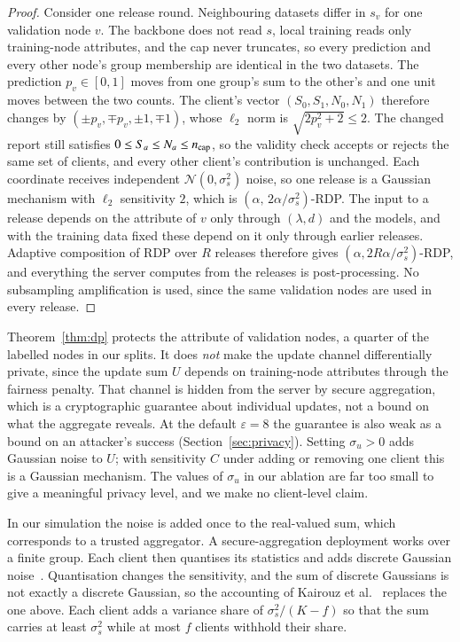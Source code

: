 \begin{proof}
Consider one release round. Neighbouring datasets differ in $s_v$ for one validation node $v$. The backbone does not read $s$, local training reads only training-node attributes, and the cap never truncates, so every prediction and every other node's group membership are identical in the two datasets. The prediction $p_v\in[0,1]$ moves from one group's sum to the other's and one unit moves between the two counts. The client's vector $(S_0,S_1,N_0,N_1)$ therefore changes by $(\pm p_v,\mp p_v,\pm1,\mp1)$, whose $\ell_2$ norm is $\sqrt{2p_v^2+2}\le2$. The changed report still satisfies $0\le S_a\le N_a\le n_{\mathrm{cap}}$, so the validity check accepts or rejects the same set of clients, and every other client's contribution is unchanged. Each coordinate receives independent $\mathcal{N}(0,\sigma_s^2)$ noise, so one release is a Gaussian mechanism with $\ell_2$ sensitivity $2$, which is $(\alpha,\,2\alpha/\sigma_s^2)$-RDP. The input to a release depends on the attribute of $v$ only through $(\lambda,d)$ and the models, and with the training data fixed these depend on it only through earlier releases. Adaptive composition of RDP over $R$ releases therefore gives $(\alpha,2R\alpha/\sigma_s^2)$-RDP, and everything the server computes from the releases is post-processing. No subsampling amplification is used, since the same validation nodes are used in every release.
\end{proof}

\begin{remark}[Scope]
Theorem~\ref{thm:dp} protects the attribute of validation nodes, a quarter of the labelled nodes in our splits. It does \emph{not} make the update channel differentially private, since the update sum $U$ depends on training-node attributes through the fairness penalty. That channel is hidden from the server by secure aggregation, which is a cryptographic guarantee about individual updates, not a bound on what the aggregate reveals. At the default $\varepsilon=8$ the guarantee is also weak as a bound on an attacker's success (Section~\ref{sec:privacy}). Setting $\sigma_u>0$ adds Gaussian noise to $U$; with sensitivity $C$ under adding or removing one client this is a Gaussian mechanism. The values of $\sigma_u$ in our ablation are far too small to give a meaningful privacy level, and we make no client-level claim.
\end{remark}

\begin{remark}
In our simulation the noise is added once to the real-valued sum, which corresponds to a trusted aggregator. A secure-aggregation deployment works over a finite group. Each client then quantises its statistics and adds discrete Gaussian noise~\citep{canonne2020discrete,kairouz2021distributed}. Quantisation changes the sensitivity, and the sum of discrete Gaussians is not exactly a discrete Gaussian, so the accounting of Kairouz et al.~\citep{kairouz2021distributed} replaces the one above. Each client adds a variance share of $\sigma_s^2/(K-f)$ so that the sum carries at least $\sigma_s^2$ while at most $f$ clients withhold their share.
\end{remark}

